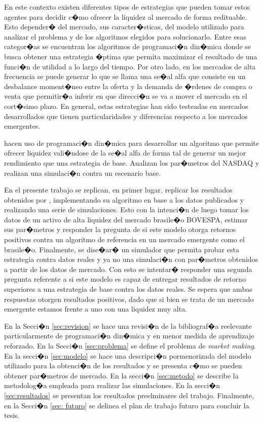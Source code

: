 \documentclass[12pt,a4paper,spanish]{article}%
\begin{document}
En este contexto existen diferentes tipos de estrategias que pueden tomar estos agentes para decidir c�mo ofrecer la liquidez al mercado de forma redituable. Esto depender� del mercado, sus caracter�sticas, del modelo utilizado para analizar el problema y de los algoritmos elegidos para solucionarlo. Entre esas categor�as se encuentran los algoritmos de programaci�n din�mica donde se busca obtener una estrategia �ptima que permita maximizar el resultado de una funci�n de utilidad a lo largo del tiempo. Por otro lado, en los mercados de alta frecuencia se puede generar lo que se llama una se�al alfa que consiste en un desbalance moment�neo entre la oferta y la demanda de �rdenes de compra o venta que permitir�a inferir en que direcci�n se va a mover el mercado en el cort�simo plazo. En general, estas estrategias han sido testeadas en mercados desarrollados que tienen particularidades y diferencias respecto a los mercados emergentes.

\cite{Cartea2019} hacen uso de programaci�n din�mica para desarrollar un algoritmo que permite ofrecer liquidez vali�ndose de la se�al alfa de forma tal de generar un mejor rendimiento que una estrategia de base. Analizan los par�metros del NASDAQ y realizan una simulaci�n contra un escenario base. 

En el presente trabajo se replican, en primer lugar, replicar los resultados obtenidos por \cite{Cartea2019}, implementando su algoritmo en base a los datos publicados y realizando una serie de simulaciones. Esto con la intenci�n de luego tomar los datos de un activo de alta liquidez del mercado brasile�o BOVESPA, estimar sus par�metros y responder la pregunta de si este modelo otorga retornos positivos contra un algoritmo de referencia en un mercado emergente como el brasile�o. Finalmente, se dise�ar� un simulador que permita probar esta estrategia contra datos reales y ya no una simulaci�n con par�metros obtenidos a partir de los datos de mercado. Con esto se intentar� responder una segunda pregunta referente a si este modelo es capaz de entregar resultados de retorno superiores a una estrategia de base contra los datos reales. Se espera que ambas respuestas otorgen resultados positivos, dado que si bien se trata de un mercado emergente estamos frente a uno con una liquidez muy alta.

En la Secci�n \ref{sec:revision} se hace una revisi�n de la bibliograf�a reelevante particularmente de programaci�n din�mica y en menor medida de aprendizaje reforzado. En la Secci�n \ref{sec:problema} se define el problema de \textit{market making}. En la secci�n \ref{sec:modelo} se hace una descripci�n pormenorizada del modelo utilizado para la obtenci�n de los resultados y se presenta c�mo se pueden obtener par�metros de mercado. En la secci�n \ref{sec:metodo} se describe la metodolog�a empleada para realizar las simulaciones. En la secci�n \ref{sec:resultados} se presentan los resultados preelminares del trabajo. Finalmente, en la Secci�n \ref{sec: futuro} se delinea el plan de trabajo futuro para concluir la tesis.
\end{document}
